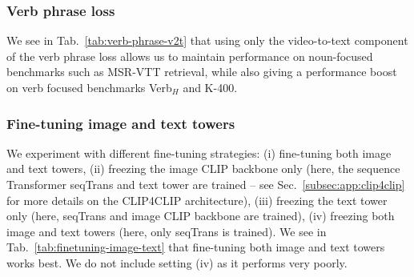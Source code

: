 \subsubsection{Verb phrase loss}\label{subsec:verb-phrase-ablation}
We see in Tab.~\ref{tab:verb-phrase-v2t} that using only the video-to-text component of the verb phrase loss allows us to maintain performance on noun-focused benchmarks such as MSR-VTT retrieval, while also giving a performance boost on verb focused benchmarks Verb$_H$ and K-400. 

\begin{table}
    \setlength{\tabcolsep}{4pt}
    \centering
     \vspace{0.2cm}
    \caption{
    \textbf{Verb phrase loss.}
We report MSR-VTT T2V retrieval on the 1k split, multi-choice accuracy on Verb$_H$~\cite{park-etal-2022-exposing} and Kinetics-400 top-1 accuracy. We observe that using only the video-to-text component of the verb phrase loss allows us to maintain performance on noun-focused benchmarks such as MSR-VTT retrieval, while also giving a performance boost on Verb$_H$ and K-400. For experiments including hard negatives, we note that one hard negative is sampled for each video here.}
    \label{tab:verb-phrase-v2t}
\end{table}



\subsubsection{Fine-tuning image and text towers}\label{subsec:freezing}
We experiment with different fine-tuning strategies: (i) fine-tuning both image and text towers, (ii) freezing the image CLIP backbone only (here, the sequence Transformer seqTrans and text tower are trained -- see Sec.~\ref{subsec:app:clip4clip} for more details on the CLIP4CLIP architecture), (iii) freezing the text tower only (here, seqTrans and image CLIP backbone are trained), (iv) freezing both image and text towers (here, only seqTrans is trained). We see in Tab.~\ref{tab:finetuning-image-text} that fine-tuning both image and text towers works best. We do not include setting (iv) as it performs very poorly.


